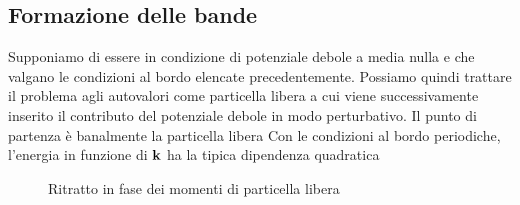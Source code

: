 \documentclass[a4paper,12pt]{article}
\begin{document}
\subsection{Formazione delle bande}
Supponiamo di essere in condizione di potenziale debole a media nulla e che valgano le condizioni al bordo elencate precedentemente. Possiamo quindi trattare il problema agli autovalori come particella libera a cui viene successivamente inserito il contributo del potenziale debole in modo perturbativo. Il punto di partenza è banalmente la particella libera
Con le condizioni al bordo periodiche, l'energia in funzione di $\it\bf k$ ha la tipica dipendenza quadratica
\begin{figure}
	\centering
	\caption{Ritratto in fase dei momenti di particella libera}
	\label{str:int}
\end{figure}
\end{document}
